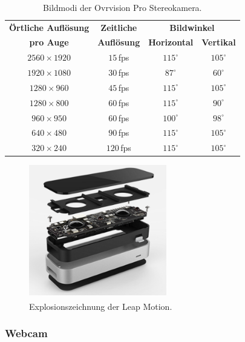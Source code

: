 \begin{table}
	\centering
	\begin{tabular}{|c|c|c|c|}
		\hline
		\Absatzbox{}
		\textbf{Örtliche Auflösung}& \textbf{Zeitliche} & \multicolumn{2}{c|}{\textbf{Bildwinkel}}\\
		\cline{3-4}
		\Absatzbox{}
		\textbf{pro Auge}& \textbf{Auflösung} & \textbf{Horizontal} & \textbf{Vertikal}\\
		\hline
		$2560\times1920$ & $15$\,fps & $115^\circ$ & $105^\circ$\\
		\hline
		$1920\times1080$ & $30$\,fps & $87^\circ$ & $60^\circ$\\
		\hline
		$1280\times960$ & $45$\,fps & $115^\circ$ & $105^\circ$\\
		\hline
		$1280\times800$ & $60$\,fps & $115^\circ$ & $90^\circ$\\
		\hline
		$960\times950$ & $60$\,fps & $100^\circ$ & $98^\circ$\\
		\hline
		$640\times480$ & $90$\,fps & $115^\circ$ & $105^\circ$\\
		\hline
		$320\times240$ & $120$\,fps & $115^\circ$ & $105^\circ$\\
		\hline
	\end{tabular}
	\caption{Bildmodi der Ovrvision Pro Stereokamera.\textsuperscript{\cite{website:ovrvisionProduct}}}
	\label{tab:ovrRes}
\end{table}

\begin{figure}[H]
	\centering
	\includegraphics[width=6cm]{Bilder/leap-motion.png}			
		\caption{Explosionszeichnung der Leap Motion.\textsuperscript{\cite{website:LeapMotionBlog}}}
		\label{fig:leapMotion}
\end{figure}
	
\subsubsection{Webcam}

